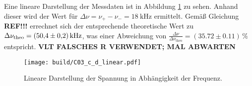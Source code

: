 \noindent
Eine lineare Darstellung der Messdaten ist in Abbildung \ref{fig:plot_spannung} zu sehen.
Anhand dieser wird der Wert für $\Delta \nu = \nu_+ -\nu_- = \qty{18}{\kilo\hertz}$ ermittelt.
Gemäß Gleichung \textbf{REF!!!} errechnet sich der entsprechende theoretische Wert zu 
$\Delta \nu_\text{theo} = (\num{50.4} \pm \num{0.2}) \, \unit{{\kilo\hertz}}$,
was einer Abweichung von $\frac{\Delta \nu}{\Delta \nu_\text{theo}} = (\num{35.72} \pm \num{0.11}) \, \%$ entspricht.
\textbf{VLT FALSCHES R VERWENDET; MAL ABWARTEN}
%
\begin{figure}[H]
    \centering
    \texttt{[image: build/C03\_c\_d\_linear.pdf]}
    \caption{Lineare Darstellung der Spannung in Abhängigkeit der Frequenz.}
    \label{fig:plot_spannung}
\end{figure}


